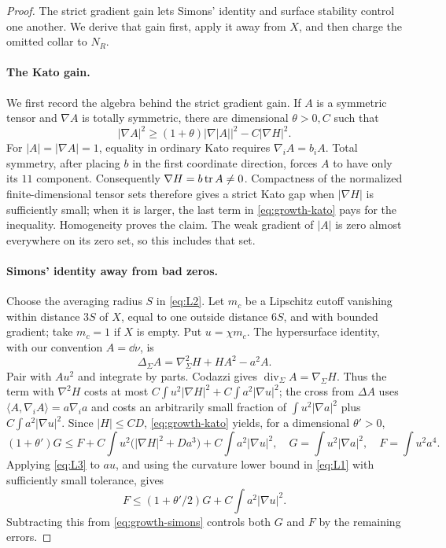 \begin{proof}
The strict gradient gain lets Simons' identity and surface stability
control one another.  We derive that gain first, apply it away from
$X$, and then charge the omitted collar to $N_R$.

\paragraph{The Kato gain.}
We first record the algebra behind the strict gradient gain.  If $A$ is
a symmetric tensor and $\nabla A$ is totally symmetric, there are
dimensional $\theta>0,C$ such that
\begin{equation}\label{eq:growth-kato}
 |\nabla A|^2\ge(1+\theta)|\nabla|A||^2-C|\nabla H|^2.
\end{equation}
For $|A|=|\nabla A|=1$, equality in ordinary Kato requires
$\nabla_iA=b_iA$.  Total symmetry, after placing $b$ in the first
coordinate direction, forces $A$ to have only its $11$ component.
Consequently $\nabla H=b\operatorname{tr} A\ne0$.  Compactness of the normalized
finite-dimensional tensor sets therefore gives a strict Kato gap when
$|\nabla H|$ is sufficiently small; when it is larger, the last term in
\eqref{eq:growth-kato} pays for the inequality.  Homogeneity proves the
claim.  The weak gradient of $|A|$ is zero almost everywhere on its zero
set, so this includes that set.

\paragraph{Simons' identity away from bad zeros.}
Choose the averaging radius $S$ in \eqref{eq:L2}.  Let $m_c$ be a
Lipschitz cutoff vanishing within distance $3S$ of $X$, equal to one
outside distance $6S$, and with bounded gradient; take $m_c=1$ if $X$ is
empty.  Put $u=\chi m_c$.  The hypersurface identity, with our convention
$A=\dd\nu$, is
\[
 \Delta_\Sigma A=\nabla_\Sigma^2H+HA^2-a^2A.
\]
Pair with $A u^2$ and integrate by parts.  Codazzi gives
$\operatorname{div}_\Sigma A=\nabla_\Sigma H$.  Thus the term with
$\nabla^2H$ costs at most
$C\int u^2|\nabla H|^2+C\int a^2|\nabla u|^2$; the cross from
$\Delta A$ uses $\langle A,\nabla_iA\rangle=a\nabla_i a$ and costs an
arbitrarily small fraction of $\int u^2|\nabla a|^2$ plus
$C\int a^2|\nabla u|^2$.  Since $|H|\le CD$, \eqref{eq:growth-kato}
yields, for a dimensional $\theta'>0$,
\begin{equation}\label{eq:growth-simons}
 (1+\theta')G\le F+
 C\int u^2\bigl(|\nabla H|^2+Da^3\bigr)
 +C\int a^2|\nabla u|^2,
 \quad G=\int u^2|\nabla a|^2,\quad F=\int u^2a^4.
\end{equation}
Applying \eqref{eq:L3} to $au$, and using the curvature lower bound in
\eqref{eq:L1} with sufficiently small tolerance, gives
\[
 F\le(1+\theta'/2)G+C\int a^2|\nabla u|^2.
\]
Subtracting this from \eqref{eq:growth-simons} controls both $G$ and $F$
by the remaining errors.


\end{proof}

